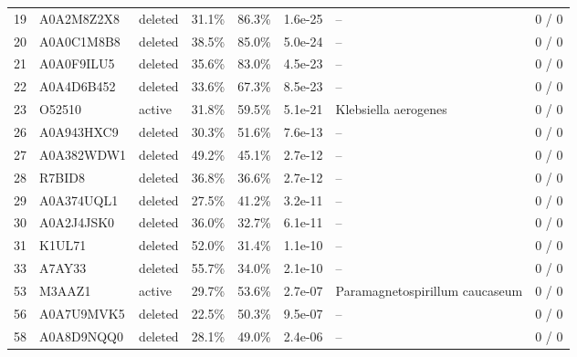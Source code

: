 \documentclass[10pt,letterpaper]{article}
\begin{document}
{\begin{longtable}{@{}rlllrrll@{}}
19 & A0A2M8Z2X8 & deleted & 31.1\% & 86.3\% & 1.6e-25 & -- & 0 / 0 \\
20 & A0A0C1M8B8 & deleted & 38.5\% & 85.0\% & 5.0e-24 & -- & 0 / 0 \\
21 & A0A0F9ILU5 & deleted & 35.6\% & 83.0\% & 4.5e-23 & -- & 0 / 0 \\
22 & A0A4D6B452 & deleted & 33.6\% & 67.3\% & 8.5e-23 & -- & 0 / 0 \\
23 & O52510 & active & 31.8\% & 59.5\% & 5.1e-21 & Klebsiella aerogenes & 0 / 0 \\
26 & A0A943HXC9 & deleted & 30.3\% & 51.6\% & 7.6e-13 & -- & 0 / 0 \\
27 & A0A382WDW1 & deleted & 49.2\% & 45.1\% & 2.7e-12 & -- & 0 / 0 \\
28 & R7BID8 & deleted & 36.8\% & 36.6\% & 2.7e-12 & -- & 0 / 0 \\
29 & A0A374UQL1 & deleted & 27.5\% & 41.2\% & 3.2e-11 & -- & 0 / 0 \\
30 & A0A2J4JSK0 & deleted & 36.0\% & 32.7\% & 6.1e-11 & -- & 0 / 0 \\
31 & K1UL71 & deleted & 52.0\% & 31.4\% & 1.1e-10 & -- & 0 / 0 \\
33 & A7AY33 & deleted & 55.7\% & 34.0\% & 2.1e-10 & -- & 0 / 0 \\
53 & M3AAZ1 & active & 29.7\% & 53.6\% & 2.7e-07 & Paramagnetospirillum caucaseum & 0 / 0 \\
56 & A0A7U9MVK5 & deleted & 22.5\% & 50.3\% & 9.5e-07 & -- & 0 / 0 \\
58 & A0A8D9NQQ0 & deleted & 28.1\% & 49.0\% & 2.4e-06 & -- & 0 / 0 \\
\end{longtable}
}
\end{document}

